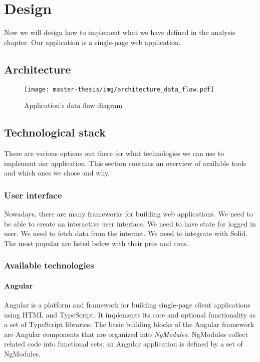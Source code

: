 \chapter{Design}
Now we will design how to implement what we have defined in the analysis chapter.
Our application is a single-page web application.

\section{Architecture}
\begin{figure}[h]
  \centering
  \texttt{[image: master-thesis/img/architecture\_data\_flow.pdf]}
  \caption{Application's data flow diagram}
\end{figure}

\section{Technological stack}
There are various options out there for what technologies we can use to implement our application.
This section contains an overview of available tools and which ones we chose and why.

\subsection{User interface}
Nowadays, there are many frameworks for building web applications.
We need to be able to create an interactive user interface.
We need to have state for logged in user.
We need to fetch data from the internet.
We need to integrate with Solid.
The most popular are listed below with their pros and cons.

\subsection*{Available technologies}

\subsubsection*{Angular}
Angular is a platform and framework for building single-page client applications using HTML and TypeScript. 
It implements its core and optional functionality as a set of TypeScript libraries. 
The basic building blocks of the Angular framework are Angular components that are organized into \emph{NgModules}. 
NgModules collect related code into functional sets; an Angular application is defined by a set of NgModules.

